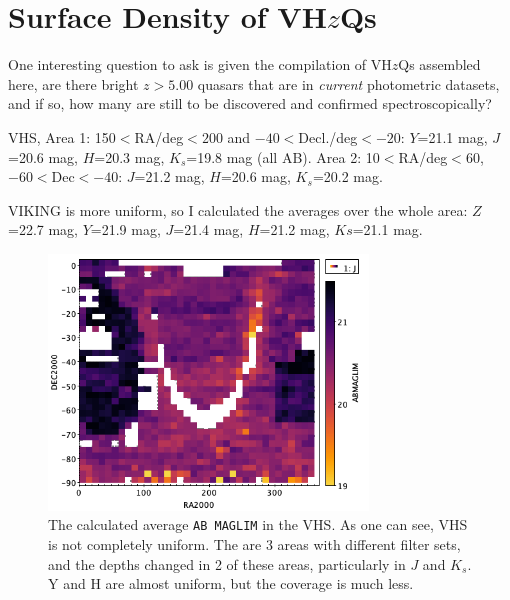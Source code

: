 \documentclass[usenatbib]{mnras}
\begin{document}
\section{Surface Density of VH$z$Qs}
One interesting question to ask is given the compilation of VH$z$Qs assembled here, 
are there bright $z>5.00$ quasars that are in {\it current} photometric datasets, and if 
so, how many are still to be discovered and confirmed spectroscopically?

VHS, Area 1: 150$<$RA/deg$<200$ and $-40<$Decl./deg$<-20$:
$Y$=21.1 mag, $J$=20.6 mag, $H$=20.3 mag, $K_{s}$=19.8 mag (all AB). 
Area 2: 10$<$RA/deg$<$60, $-60<$Dec$<-40$:
$J$=21.2 mag, $H$=20.6 mag, $K_{s}$=20.2 mag. 

VIKING is more uniform, so I calculated the averages over the whole area:
$Z$=22.7 mag, $Y$=21.9 mag, $J$=21.4 mag, $H$=21.2 mag, $Ks$=21.1 mag.

\begin{figure}
  \centering
  \includegraphics[width=8.5cm]{../data/WSA_VSA/VHS_J_abMagLim.png}
  \caption{The calculated average {\tt AB MAGLIM} in the VHS.
    As one can see, VHS is not completely uniform. The are 3 areas with different filter sets, 
    and the depths changed in 2 of these areas, particularly in $J$ and $K_{s}$. 
    Y and H are almost uniform, but the coverage is much less.}
  \label{fig:1}
\end{figure}
\end{document}
